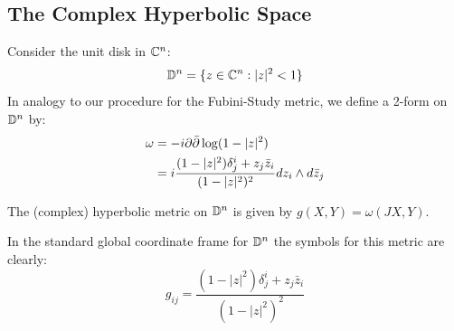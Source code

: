 \subsection{The Complex Hyperbolic Space}

Consider the unit disk in $\mathbb{C}^n$:
%
$$ \mathbb{D}^n = \{ z \in \mathbb{C}^n : |z|^2 < 1 \} $$
%
In analogy to our procedure for the Fubini-Study metric, we define a 2-form on $\mathbb{D}^n$ by:
%
\begin{align*}
\omega &= - i \partial \bar{\partial} \log ( 1 - |z|^2 ) \\
&= i \frac{ (1 - |z|^2) \delta^i_j + z_j \bar{z}_i }{ (1 - |z|^2)^2 } d z_i \wedge d \bar{z}_j
\end{align*}

\begin{definition} The (complex) hyperbolic metric on $\mathbb{D}^n$ is given by $g(X,Y) = \omega(JX,Y)$.
\end{definition}

In the standard global coordinate frame for $\mathbb{D}^n$ the symbols for this metric are clearly:
%
$$ g_{ij} = \frac{ (1 - |z|^2) \delta^i_j + z_j \bar{z}_i }{ (1 - |z|^2)^2 } $$
%


